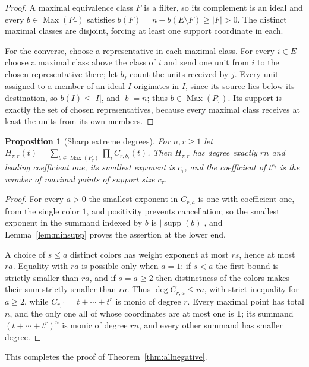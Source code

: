 \documentclass[11pt]{article}
\numberwithin{equation}{section}
\newtheorem{proposition}[theorem]{Proposition}
\theoremstyle{definition}
\theoremstyle{remark}
\newcommand{\one}{\mathbf 1}
\newcommand{\supp}{\operatorname{supp}}
\newcommand{\Max}{\operatorname{Max}}
\begin{document}
\begin{proof}
A maximal equivalence class $F$ is a filter, so its complement is an ideal and
every $b\in\Max(P_\tau)$ satisfies $b(F)=n-b(E\setminus F)\ge|F|>0$. The
distinct maximal classes are disjoint, forcing at least one support coordinate
in each.

For the converse, choose a representative in each maximal class. For every
$i\in E$ choose a maximal class above the class of $i$ and send one unit from
$i$ to the chosen representative there; let $b_j$ count the units received by
$j$. Every unit assigned to a member of an ideal $I$ originates in $I$, since
its source lies below its destination, so $b(I)\le|I|$, and $|b|=n$; thus
$b\in\Max(P_\tau)$. Its support is exactly the set of chosen representatives,
because every maximal class receives at least the units from its own members.
\end{proof}

\begin{proposition}[Sharp extreme degrees]
\label{prop:degrees}
For $n,r\ge1$ let $H_{\tau,r}(t)=\sum_{b\in \Max(P_\tau)}\prod_iC_{r,b_i}(t)$.
Then $H_{\tau,r}$ has degree exactly $rn$ and leading coefficient one, its
smallest exponent is $c_\tau$, and the coefficient of $t^{c_\tau}$ is the
number of maximal points of support size $c_\tau$.
\end{proposition}

\begin{proof}
For every $a>0$ the smallest exponent in $C_{r,a}$ is one with coefficient
one, from the single color $1$, and positivity prevents cancellation; so the
smallest exponent in the summand indexed by $b$ is $|\supp(b)|$, and
Lemma~\ref{lem:minsupp} proves the assertion at the lower end.

A choice of $s\le a$ distinct colors has weight exponent at most $rs$, hence
at most $ra$. Equality with $ra$ is possible only when $a=1$: if $s<a$ the
first bound is strictly smaller than $ra$, and if $s=a\ge2$ then distinctness
of the colors makes their sum strictly smaller than $ra$. Thus
$\deg C_{r,a}\le ra$, with strict inequality for $a\ge2$, while
$C_{r,1}=t+\cdots+t^r$ is monic of degree $r$. Every maximal point has total
$n$, and the only one all of whose coordinates are at most one is $\one$; its
summand $(t+\cdots+t^r)^n$ is monic of degree $rn$, and every other summand
has smaller degree.
\end{proof}

This completes the proof of Theorem~\ref{thm:allnegative}.
\end{document}
